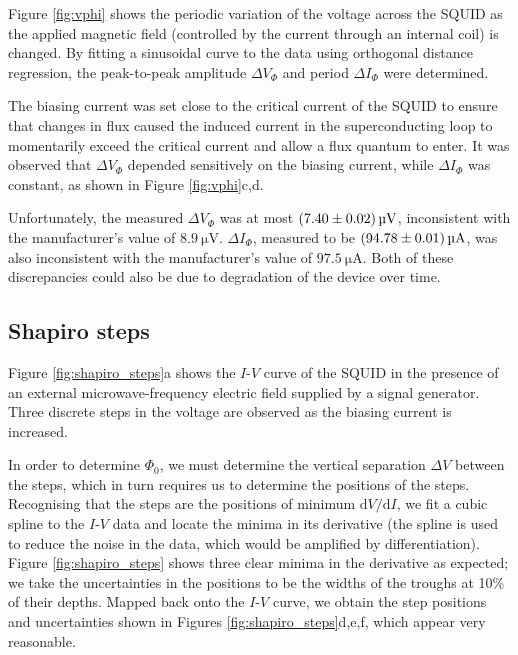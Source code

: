 \documentclass[twocol]{ametsocV6.1}
\begin{document}
Figure \ref{fig:vphi} shows the periodic variation of the voltage across
the SQUID as the applied magnetic field (controlled by the current through
an internal coil) is changed. By fitting a sinusoidal curve to the data using
orthogonal distance regression, the peak-to-peak amplitude
$\Delta V_\Phi$ and period $\Delta I_\Phi$ were determined.

The biasing current was set close to
the critical current of the SQUID to ensure that changes in flux caused
the induced current in the superconducting loop to momentarily exceed the
critical current and allow a flux quantum to enter. It was observed that
$\Delta V_\Phi$ depended sensitively on the biasing current, while
$\Delta I_\Phi$ was constant, as shown in Figure \ref{fig:vphi}c,d.

Unfortunately, the measured $\Delta V_\Phi$ was at most
$\SI{7.4 \pm 0.02}{\micro\volt}$, inconsistent with the manufacturer's value of
$\SI{8.9}{\micro\volt}$. $\Delta I_\Phi$, measured to be
$\SI{94.78 \pm 0.01}{\micro\ampere}$, was also inconsistent with the
manufacturer's value of $\SI{97.5}{\micro\ampere}$. Both of these discrepancies
could also be due to degradation of the device over time.


\subsection{Shapiro steps} \label{sec:shapiro}
Figure \ref{fig:shapiro_steps}a shows the $I$-$V$ curve of the SQUID
in the presence of an external microwave-frequency electric field supplied
by a signal generator. Three discrete steps in the voltage are observed
as the biasing current is increased.

In order to determine $\Phi_0$, we must determine the vertical
separation $\Delta V$ between the steps, which in turn requires us to
determine the positions of the steps. Recognising that the steps are the
positions of minimum $\mathrm{d}V/\mathrm{d}I$, we fit a cubic spline
to the $I$-$V$ data and locate the minima in its derivative (the spline is
used to reduce the noise in the data, which would be amplified by
differentiation). Figure \ref{fig:shapiro_steps} shows three clear minima
in the derivative as expected; we take the uncertainties in the positions
to be the widths of the troughs at 10\% of their depths. Mapped back
onto the $I$-$V$ curve, we obtain the step positions and uncertainties
shown in Figures \ref{fig:shapiro_steps}d,e,f, which appear very reasonable.
\end{document}
